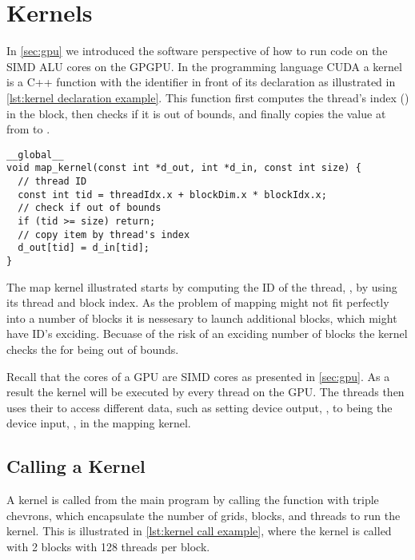 \section{Kernels}
\label{sec:kernels}

In \cref{sec:gpu} we introduced the software perspective of how to run code on the SIMD ALU cores on the GPGPU.
In the programming language CUDA a kernel is a C++ function with the  identifier in front of its declaration as illustrated in \cref{lst:kernel declaration example}.
This function first computes the thread's index () in the block, then checks if it is out of bounds, and finally copies the value at  from  to .

\begin{lstlisting}[caption={Kernel declaration example}, label={lst:kernel declaration example}]
__global__
void map_kernel(const int *d_out, int *d_in, const int size) {
  // thread ID
  const int tid = threadIdx.x + blockDim.x * blockIdx.x;
  // check if out of bounds
  if (tid >= size) return;
  // copy item by thread's index
  d_out[tid] = d_in[tid];
}
\end{lstlisting}

The map kernel illustrated starts by computing the ID of the thread, , by using its thread and block index.
As the problem of mapping might not fit perfectly into a number of blocks it is nessesary to launch additional blocks, which might have ID's exciding.
Becuase of the risk of an exciding number of blocks the kernel checks the  for being out of bounds.

Recall that the cores of a GPU are SIMD cores as presented in \cref{sec:gpu}.
As a result the kernel will be executed by every thread on the GPU.
The threads then uses their  to access different data, such as setting device output, , to being the device input, , in the mapping kernel.

\subsection{Calling a Kernel}
\label{sec:calling a kernel}

A kernel is called from the main program by calling the function with triple chevrons, which encapsulate the number of grids, blocks, and threads to run the kernel.
This is illustrated in \cref{lst:kernel call example}, where the kernel is called with 2 blocks with 128 threads per block.

